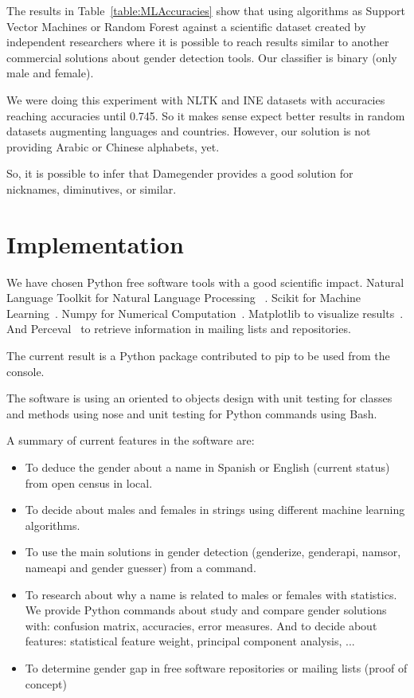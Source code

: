 \documentclass[a4paper]{article}
\begin{document}
The results in Table~\ref{table:MLAccuracies} show that using algorithms as Support Vector Machines or Random Forest against a scientific dataset created by independent researchers where it is possible to reach results similar to another commercial solutions about gender detection tools.
Our classifier is binary (only male and female).

We were doing this experiment with NLTK and INE datasets with accuracies reaching accuracies until 0.745.
So it makes sense expect better results in random datasets augmenting languages and countries.
However, our solution is not providing Arabic or Chinese alphabets, yet.

So, it is possible to infer that Damegender provides a good solution for nicknames, diminutives, or similar.

\section{Implementation}

We have chosen Python free software tools with a good scientific impact.
Natural Language Toolkit for Natural Language Processing ~\cite{loper2002nltk}.
Scikit for Machine Learning~\cite{pedregosa2011scikit}. 
Numpy for Numerical Computation~\cite{van2011numpy}. 
Matplotlib to visualize results~\cite{hunter2007matplotlib}. 
And Perceval~\cite{duenas2018perceval} to retrieve information in mailing lists and repositories.

The current result is a Python package contributed to pip to be used from the console.

The software is using an oriented to objects design with unit testing for classes and methods using nose and unit testing for Python commands using Bash. 

A summary of current features in the software are:

\begin{itemize}
\item To deduce the gender about a name in Spanish or English (current   status) from open census in local.
\item To decide about males and females in strings using different machine learning algorithms.
\item To use the main solutions in gender detection (genderize, genderapi, namsor, nameapi and gender guesser) from a command.
\item To research about why a name is related to males or females with   statistics. We provide Python commands about study and compare gender solutions with: confusion matrix, accuracies, error measures. And to decide about features: statistical feature weight, principal component analysis, ...
\item To determine gender gap in free software repositories or mailing lists (proof of concept)
\end{itemize}
\end{document}
